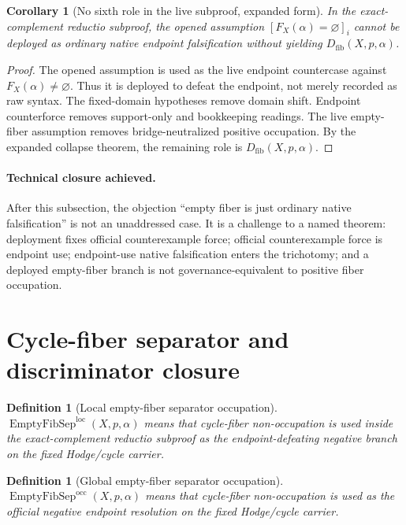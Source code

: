 \documentclass[11pt]{article}
\newtheorem{corollary}[theorem]{Corollary}
\newtheorem{definition}[theorem]{Definition}
\newcommand{\EmptySep}{\operatorname{EmptyFibSep}}
\begin{document}
\begin{corollary}[No sixth role in the live subproof, expanded form]
In the exact-complement reductio subproof, the opened assumption $[F_X(\alpha)=\varnothing]_i$ cannot be deployed as ordinary native endpoint falsification without yielding $D_{\mathrm{fib}}(X,p,\alpha)$.
\end{corollary}
\begin{proof}
The opened assumption is used as the live endpoint countercase against $F_X(\alpha)\neq\varnothing$. Thus it is deployed to defeat the endpoint, not merely recorded as raw syntax. The fixed-domain hypotheses remove domain shift. Endpoint counterforce removes support-only and bookkeeping readings. The live empty-fiber assumption removes bridge-neutralized positive occupation. By the expanded collapse theorem, the remaining role is $D_{\mathrm{fib}}(X,p,\alpha)$.
\end{proof}

\paragraph{Technical closure achieved.} After this subsection, the objection ``empty fiber is just ordinary native falsification'' is not an unaddressed case. It is a challenge to a named theorem: deployment fixes official counterexample force; official counterexample force is endpoint use; endpoint-use native falsification enters the trichotomy; and a deployed empty-fiber branch is not governance-equivalent to positive fiber occupation.


\section{Cycle-fiber separator and discriminator closure}

\begin{definition}[Local empty-fiber separator occupation]
$\EmptySep^{\mathrm{loc}}(X,p,\alpha)$ means that cycle-fiber non-occupation is used inside the exact-complement reductio subproof as the endpoint-defeating negative branch on the fixed Hodge/cycle carrier.
\end{definition}

\begin{definition}[Global empty-fiber separator occupation]
$\EmptySep^{\mathrm{occ}}(X,p,\alpha)$ means that cycle-fiber non-occupation is used as the official negative endpoint resolution on the fixed Hodge/cycle carrier.
\end{definition}
\end{document}
